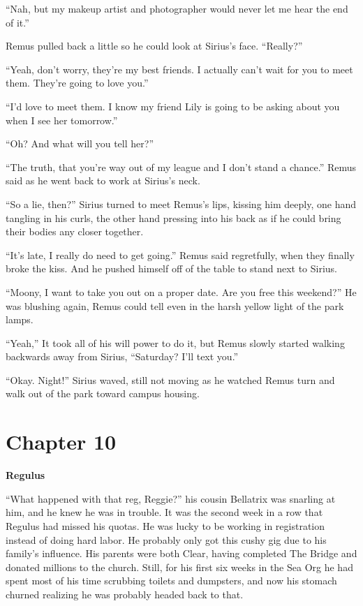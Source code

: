 \documentclass[12pt,twoside,openright]{memoir}
\begin{document}
``Nah, but my makeup artist and photographer would never let me hear the end of it.''

Remus pulled back a little so he could look at Sirius's face. ``Really?''

``Yeah, don't worry, they're my best friends. I actually can't wait for you to meet them. They're going to love you.''

``I'd love to meet them. I know my friend Lily is going to be asking about you when I see her tomorrow.''

``Oh? And what will you tell her?''

``The truth, that you're way out of my league and I don't stand a chance.'' Remus said as he went back to work at Sirius's neck.

``So a lie, then?'' Sirius turned to meet Remus's lips, kissing him deeply, one hand tangling in his curls, the other hand pressing into his back as if he could bring their bodies any closer together.

``It's late, I really do need to get going.'' Remus said regretfully, when they finally broke the kiss. And he pushed himself off of the table to stand next to Sirius.

``Moony, I want to take you out on a proper date. Are you free this weekend?'' He was blushing again, Remus could tell even in the harsh yellow light of the park lamps.

``Yeah,'' It took all of his will power to do it, but Remus slowly started walking backwards away from Sirius, ``Saturday?
I'll text you.''

``Okay. Night!'' Sirius waved, still not moving as he watched Remus turn and walk out of the park toward campus housing.

\chapter*{Chapter 10}

\textbf{Regulus} 

``What happened with that reg, Reggie?'' his cousin Bellatrix was snarling at him, and he knew he was in trouble. It was the second week in a row that Regulus had missed his quotas. He was lucky to be working in registration instead of doing hard labor. He probably only got this cushy gig due to his family's influence. His parents were both Clear, having completed The Bridge and donated millions to the church. Still, for his first six weeks in the Sea Org he had spent most of his time scrubbing toilets and dumpsters, and now his stomach churned realizing he was probably headed back to that.
\end{document}

